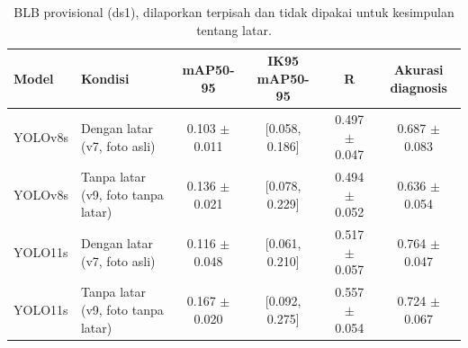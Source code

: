 \begin{table}[!t]
\centering
\caption{BLB provisional (ds1), dilaporkan terpisah dan tidak dipakai untuk kesimpulan tentang latar.}
\label{tab:v9_blb}
\footnotesize
\setlength{\tabcolsep}{3pt}
\begin{tabular}{llcccc}
\hline
\textbf{Model} & \textbf{Kondisi} & \textbf{mAP50-95} & \textbf{IK95 mAP50-95} & \textbf{R} & \textbf{Akurasi diagnosis} \\
\hline
YOLOv8s & Dengan latar (v7, foto asli) & 0.103 $\pm$ 0.011 & [0.058, 0.186] & 0.497 $\pm$ 0.047 & 0.687 $\pm$ 0.083 \\
YOLOv8s & Tanpa latar (v9, foto tanpa latar) & 0.136 $\pm$ 0.021 & [0.078, 0.229] & 0.494 $\pm$ 0.052 & 0.636 $\pm$ 0.054 \\
YOLO11s & Dengan latar (v7, foto asli) & 0.116 $\pm$ 0.048 & [0.061, 0.210] & 0.517 $\pm$ 0.057 & 0.764 $\pm$ 0.047 \\
YOLO11s & Tanpa latar (v9, foto tanpa latar) & 0.167 $\pm$ 0.020 & [0.092, 0.275] & 0.557 $\pm$ 0.054 & 0.724 $\pm$ 0.067 \\
\hline
\end{tabular}
\end{table}
